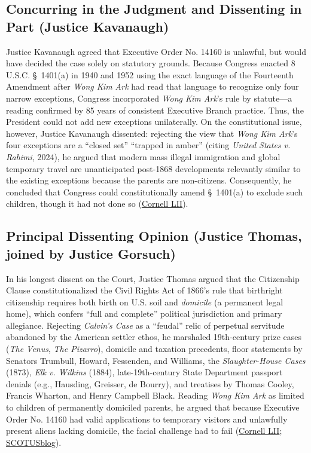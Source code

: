 \documentclass[12pt]{article}
\begin{document}
\subsection{Concurring in the Judgment and Dissenting in Part (Justice Kavanaugh)}
Justice Kavanaugh agreed that Executive Order No. 14160 is unlawful, but would have decided the case solely on statutory grounds. Because Congress enacted 8 U.S.C. \S\ 1401(a) in 1940 and 1952 using the exact language of the Fourteenth Amendment after \textit{Wong Kim Ark} had read that language to recognize only four narrow exceptions, Congress incorporated \textit{Wong Kim Ark}'s rule by statute---a reading confirmed by 85 years of consistent Executive Branch practice. Thus, the President could not add new exceptions unilaterally. On the constitutional issue, however, Justice Kavanaugh dissented: rejecting the view that \textit{Wong Kim Ark}'s four exceptions are a ``closed set'' ``trapped in amber'' (citing \textit{United States v. Rahimi}, 2024), he argued that modern mass illegal immigration and global temporary travel are unanticipated post-1868 developments relevantly similar to the existing exceptions because the parents are non-citizens. Consequently, he concluded that Congress could constitutionally amend \S\ 1401(a) to exclude such children, though it had not done so (\href{https://www.law.cornell.edu/supremecourt/text/25-365}{Cornell LII}).

\subsection{Principal Dissenting Opinion (Justice Thomas, joined by Justice Gorsuch)}
In his longest dissent on the Court, Justice Thomas argued that the Citizenship Clause constitutionalized the Civil Rights Act of 1866's rule that birthright citizenship requires both birth on U.S. soil and \textit{domicile} (a permanent legal home), which confers ``full and complete'' political jurisdiction and primary allegiance. Rejecting \textit{Calvin's Case} as a ``feudal'' relic of perpetual servitude abandoned by the American settler ethos, he marshaled 19th-century prize cases (\textit{The Venus}, \textit{The Pizarro}), domicile and taxation precedents, floor statements by Senators Trumbull, Howard, Fessenden, and Williams, the \textit{Slaughter-House Cases} (1873), \textit{Elk v. Wilkins} (1884), late-19th-century State Department passport denials (e.g., Hausding, Greisser, de Bourry), and treatises by Thomas Cooley, Francis Wharton, and Henry Campbell Black. Reading \textit{Wong Kim Ark} as limited to children of permanently domiciled parents, he argued that because Executive Order No. 14160 had valid applications to temporary visitors and unlawfully present aliens lacking domicile, the facial challenge had to fail (\href{https://www.law.cornell.edu/supremecourt/text/25-365}{Cornell LII}; \href{https://www.scotusblog.com/2026/06/breaking-down-the-birthright-citizenship-decision/}{SCOTUSblog}).
\end{document}

